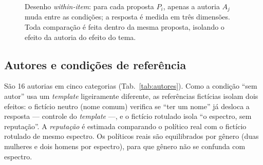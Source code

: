 \documentclass[conference]{IEEEtran}
\begin{document}
\begin{figure}[t]
\centering
{}
\caption{Desenho \textit{within-item}: para cada proposta $P_i$, apenas a autoria
$A_j$ muda entre as condições; a resposta é medida em três dimensões. Toda
comparação é feita dentro da mesma proposta, isolando o efeito da autoria do
efeito do tema.}
\label{fig:design}
\end{figure}

\subsection{Autores e condições de referência}
São 16 autorias em cinco categorias (Tab.~\ref{tab:autores}). Como a condição
``sem autor'' usa um \textit{template} ligeiramente diferente, as referências
fictícias isolam dois efeitos: o fictício neutro (nome comum) verifica se ``ter
um nome'' já desloca a resposta --- controle do \textit{template} ---, e o
fictício rotulado isola ``o espectro, sem reputação''. A \emph{reputação} é
estimada comparando o político real com o fictício rotulado de mesmo espectro.
Os políticos reais são equilibrados por gênero (duas mulheres e dois homens por
espectro), para que gênero não se confunda com espectro.
\end{document}
